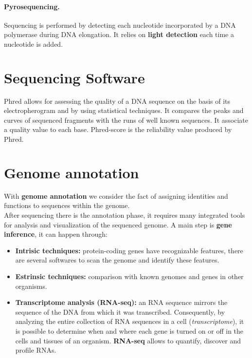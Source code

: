 \paragraph*{Pyrosequencing.} Sequencing is performed by detecting each nucleotide incorporated by a DNA polymerase during DNA elongation. It relies on \textbf{light detection} each time a nucleotide is added.

\section{Sequencing Software}
Phred allows for assessing the quality of a DNA sequence on the basis of its electropherogram and by using statistical techniques. It compares the peaks and curves of sequenced fragments with the runs of well known sequences. It associate a quality value to each base.
Phred-score is the reliability value produced by Phred.

\section{Genome annotation}
With \textbf{genome annotation} we consider the fact of assigning identities and functions to sequences within the genome.\\
After sequencing there is the annotation phase, it requires many integrated tools for analysis and visualization of the sequenced genome. A main step is \textbf{gene inference}, it can happen through:
\begin{itemize}
	\item \textbf{Intrisic techniques:} protein-coding genes have recognizable features, there are several softwares to scan the genome and identify these features.
	\item \textbf{Estrinsic techniques:} comparison with known genomes and genes in other organisms.
	\item \textbf{Transcriptome analysis (RNA-seq):} an RNA sequence mirrors the sequence of the DNA from which it was transcribed. Consequently, by analyzing the entire collection of RNA sequences in a cell (\textit{transcriptome}), it is possible to determine when and where each gene is turned on or off in the cells and tissues of an organism. \textbf{RNA-seq} allows to quantify, discover and profile RNAs. 
\end{itemize}